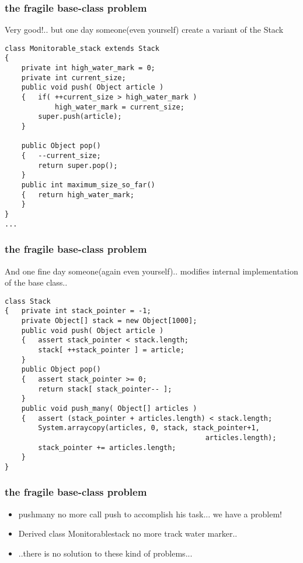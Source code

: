 \documentclass{beamer}
\begin{document}
\begin{frame}[containsverbatim]
	\frametitle{the fragile base-class problem}
	Very good!.. but one day someone(even yourself) create a variant of the Stack   \\
	\begin{lstlisting}
class Monitorable_stack extends Stack
{
    private int high_water_mark = 0;
    private int current_size;
    public void push( Object article )
    {   if( ++current_size > high_water_mark )
            high_water_mark = current_size;
        super.push(article);
    }
    
    public Object pop()
    {   --current_size;
        return super.pop();
    }
    public int maximum_size_so_far()
    {   return high_water_mark;
    }
}
...
\end{lstlisting}
\end{frame}

\begin{frame}[containsverbatim]
	\frametitle{the fragile base-class problem}
	And one fine day someone(again even yourself).. modifies internal implementation of the base class..   \\
	\begin{lstlisting}
class Stack
{   private int stack_pointer = -1;
    private Object[] stack = new Object[1000];
    public void push( Object article )
    {   assert stack_pointer < stack.length;
        stack[ ++stack_pointer ] = article;
    }
    public Object pop()
    {   assert stack_pointer >= 0;
        return stack[ stack_pointer-- ];
    }
    public void push_many( Object[] articles )
    {   assert (stack_pointer + articles.length) < stack.length;
        System.arraycopy(articles, 0, stack, stack_pointer+1,
                                                articles.length);
        stack_pointer += articles.length;
    }
}
\end{lstlisting}
\end{frame}

\begin{frame}
  \frametitle{the fragile base-class problem}
  \begin{itemize}
  \item<+-> pushmany no more call push to accomplish his task... we have a problem!
  \item<+-> Derived class Monitorablestack no more track water marker..
  \item<+-> ..there is no solution to these kind of problems...  
  \end{itemize}
\end{frame}
\end{document}
